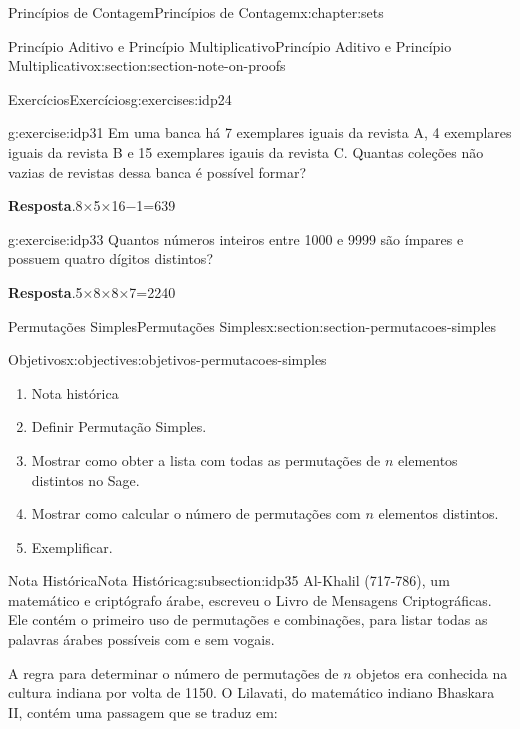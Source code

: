 \documentclass[oneside,10pt,]{book}
\newcommand{\blocktitlefont}{\relax}
\numberwithin{equation}{section}
\begin{document}
\begin{chapterptx}{Princípios de Contagem}{}{Princípios de Contagem}{}{}{x:chapter:sets}
\begin{sectionptx}{Princípio Aditivo e Princípio Multiplicativo}{}{Princípio Aditivo e Princípio Multiplicativo}{}{}{x:section:section-note-on-proofs}
\begin{exercises-subsection}{Exercícios}{}{Exercícios}{}{}{g:exercises:idp24}
\begin{divisionexercise}{4}{}{}{g:exercise:idp31}
Em uma banca há 7 exemplares iguais da revista A, 4 exemplares iguais da revista B e 15 exemplares igauis da revista C. Quantas coleções não vazias de revistas dessa banca é possível formar?%
\par\smallskip%
\noindent\textbf{\blocktitlefont Resposta}.\hypertarget{g:answer:idp32}{}\quad{}8×5×16−1=639%
\end{divisionexercise}%
\begin{divisionexercise}{5}{}{}{g:exercise:idp33}%
Quantos números inteiros entre 1000 e 9999 são ímpares e possuem quatro dígitos distintos?%
\par\smallskip%
\noindent\textbf{\blocktitlefont Resposta}.\hypertarget{g:answer:idp34}{}\quad{}5×8×8×7=2240%
\end{divisionexercise}%
\end{exercises-subsection}
\end{sectionptx}
%
%
\typeout{************************************************}
\typeout{************************************************}
%
\begin{sectionptx}{Permutações Simples}{}{Permutações Simples}{}{}{x:section:section-permutacoes-simples}
\begin{objectives}{Objetivos}{x:objectives:objetivos-permutacoes-simples}
%
\begin{enumerate}
\item{}Nota histórica%
\item{}Definir Permutação Simples.%
\item{}Mostrar como obter a lista com todas as permutações de \(n\) elementos distintos no Sage.%
\item{}Mostrar como calcular o número de permutações com \(n\) elementos distintos.%
\item{}Exemplificar.%
\end{enumerate}
\end{objectives}
%
%
\typeout{************************************************}
\typeout{************************************************}
%
\begin{subsectionptx}{Nota Histórica}{}{Nota Histórica}{}{}{g:subsection:idp35}
Al-Khalil (717-786), um matemático e criptógrafo árabe, escreveu o Livro de Mensagens Criptográficas. Ele contém o primeiro uso de permutações e combinações, para listar todas as palavras árabes possíveis com e sem vogais.%
\par
A regra para determinar o número de permutações de \(n\) objetos era conhecida na cultura indiana por volta de 1150. O Lilavati, do matemático indiano Bhaskara II, contém uma passagem que se traduz em:%

\end{subsectionptx}
\end{sectionptx}
\end{chapterptx}
\end{document}
